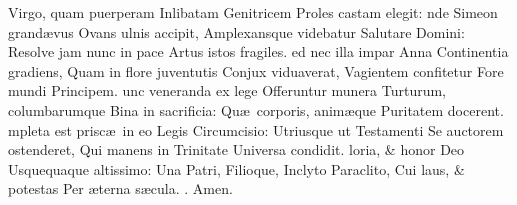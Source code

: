 \documentclass[letter,11pt]{book}
\makeatletter
\DeclareRobustCommand{\Rbar}{\vers@resp{0pt}{R}}
\newcommand{\vers@resp@sym}{\raisebox{0.2ex}{\rotatebox[origin=c]{-20}{$\m@th\rceil$}}}
\newcommand{\vers@resp}[2]{%
  {\ooalign{\hidewidth\kern#1\vers@resp@sym\hidewidth\cr#2\cr}}%
}%
\def\R{\color{Red} \Rbar . \color{black}}
\makeatother
\begin{document}
\begin{multicols*}{2}
\newline \indent Virgo, quam puerperam
\newline \indent Inlibatam Genitricem
\newline \indent Proles castam elegit:
nde Simeon grand\ae vus
\newline \indent Ovans ulnis accipit,
\newline \indent Amplexansque videbatur
\newline \indent Salutare Domini:
\newline \indent Resolve jam nunc in pace
\newline \indent Artus istos fragiles.
ed nec illa impar Anna
\newline \indent Continentia gradiens,
\newline \indent Quam in flore juventutis
\newline \indent Conjux viduaverat,
\newline \indent Vagientem confitetur
\newline \indent Fore mundi Principem.
unc veneranda ex lege
\newline \indent Offeruntur munera
\newline \indent Turturum, columbarumque
\newline \indent Bina in sacrificia:
\newline \indent Qu\ae \ corporis, anim\ae que
\newline \indent Puritatem docerent.
mpleta est prisc\ae \ in eo
\newline \indent Legis Circumcisio:
\newline \indent Utriusque ut Testamenti
\newline \indent Se auctorem ostenderet,
\newline \indent Qui manens in Trinitate
\newline \indent Universa condidit.
loria, \& honor Deo
\newline \indent Usquequaque altissimo:
\newline \indent Una Patri, Filioque,
\newline \indent Inclyto Paraclito,
\newline \indent Cui laus, \& potestas
\newline \indent Per \ae terna s\ae cula. \R Amen.

\end{multicols*}
\end{document}
